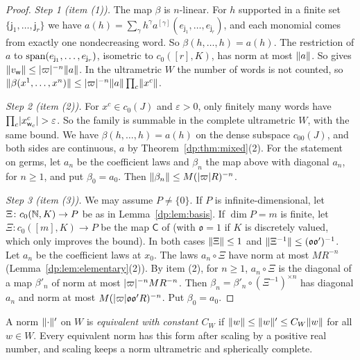 \begin{proof}
\emph{Step 1 (item (1)).} The map $\beta$ is $n$\nobreakdash-linear. For $h$ supported in a finite set $\{\mathsf j_1,\dots,\mathsf j_r\}$ we have $a(h)=\sum_\gamma h^\gamma a^{[\gamma]}(e_{\mathsf j_1},\dots,e_{\mathsf j_r})$, and each monomial comes from exactly one nondecreasing word. So $\beta(h,\dots,h)=a(h)$. The restriction of $a$ to $\operatorname{span}(e_{\mathsf j_1},\dots,e_{\mathsf j_r})$, isometric to $c_0([r],K)$, has norm at most $\lVert a\rVert$. So \cite[Lemma~Q.2(4)]{I} gives $\lVert v_{\mathsf w}\rVert\le\lvert \varpi\rvert^{-n}\lVert a\rVert$. In the ultrametric $W$ the number of words is not counted, so $\lVert \beta(x^1,\dots,x^n)\rVert\le\lvert \varpi\rvert^{-n}\lVert a\rVert\prod_c\lVert x^c\rVert$.

\emph{Step 2 (item (2)).} For $x^c\in c_0(J)$ and $\varepsilon>0$, only finitely many words have $\prod_c\lvert x^c_{\mathsf w_c}\rvert>\varepsilon$. So the family is summable in the complete ultrametric $W$, with the same bound. We have $\beta(h,\dots,h)=a(h)$ on the dense subspace $c_{00}(J)$, and both sides are continuous, $a$ by Theorem~\ref{dp:thm:mixed}(2). For the statement on germs, let $a_n$ be the coefficient laws and $\beta_n$ the map above with diagonal $a_n$, for $n\ge1$, and put $\beta_0=a_0$. Then $\lVert \beta_n\rVert\le M(\lvert \varpi\rvert R)^{-n}$.

\emph{Step 3 (item (3)).} We may assume $P\ne\{0\}$. If $P$ is infinite-dimensional, let $\Xi\colon c_0(\mathbb N,K)\to P$ be as in Lemma~\ref{dp:lem:basis}. If $\dim P=m$ is finite, let $\Xi\colon c_0([m],K)\to P$ be the map $\mathsf C$ of \cite[Lemma~Q.13(3)]{I} (with $\mathfrak o=1$ if $K$ is discretely valued, which only improves the bound). In both cases $\lVert \Xi\rVert\le1$ and $\lVert \Xi^{-1}\rVert\le(\mathfrak o\mathfrak o')^{-1}$. Let $a_n$ be the coefficient laws at $x_0$. The laws $a_n\circ\Xi$ have norm at most $MR^{-n}$ (Lemma~\ref{dp:lem:elementary}(2)). By item (2), for $n\ge1$, $a_n\circ\Xi$ is the diagonal of a map $\beta'_n$ of norm at most $\lvert \varpi\rvert^{-n}MR^{-n}$. Then $\beta_n=\beta'_n\circ(\Xi^{-1})^{\times n}$ has diagonal $a_n$ and norm at most $M(\lvert \varpi\rvert\mathfrak o\mathfrak o'R)^{-n}$. Put $\beta_0=a_0$.
\end{proof}

A norm $\lVert \cdot\rVert'$ on $W$ is \emph{equivalent with constant $C_W$} if $\lVert w\rVert\le\lVert w\rVert'\le C_W\lVert w\rVert$ for all $w\in W$. Every equivalent norm has this form after scaling by a positive real number, and scaling keeps a norm ultrametric and spherically complete.

